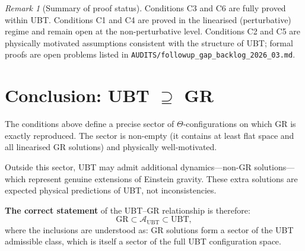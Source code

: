 \documentclass[12pt]{article}
\theoremstyle{definition}
\theoremstyle{remark}
\newtheorem{remark}[theorem]{Remark}
\begin{document}
\bigskip

\begin{remark}[Summary of proof status]
Conditions C3 and C6 are fully proved within UBT.
Conditions C1 and C4 are proved in the linearised (perturbative) regime
and remain open at the non-perturbative level.
Conditions C2 and C5 are physically motivated assumptions consistent with
the structure of UBT; formal proofs are open problems listed in
\texttt{AUDITS/followup\_gap\_backlog\_2026\_03.md}.
\end{remark}

\section{Conclusion: UBT $\supseteq$ GR}
\label{sec:conclusion}

The conditions above define a precise sector of $\Theta$-configurations on
which GR is exactly reproduced.  The sector is non-empty (it contains at
least flat space and all linearised GR solutions) and physically well-motivated.

Outside this sector, UBT may admit additional dynamics—non-GR solutions—which
represent genuine extensions of Einstein gravity.  These extra solutions are
expected physical predictions of UBT, not inconsistencies.

\medskip
\noindent
\textbf{The correct statement} of the UBT--GR relationship is therefore:
\begin{equation}
  \mathrm{GR} \subset \mathcal{A}_{\mathrm{UBT}} \subset \mathrm{UBT},
\end{equation}
where the inclusions are understood as: GR solutions form a sector of the
UBT admissible class, which is itself a sector of the full UBT configuration
space.

\ifdefined\INCLUDEMODE
\else
  
\end{document}

